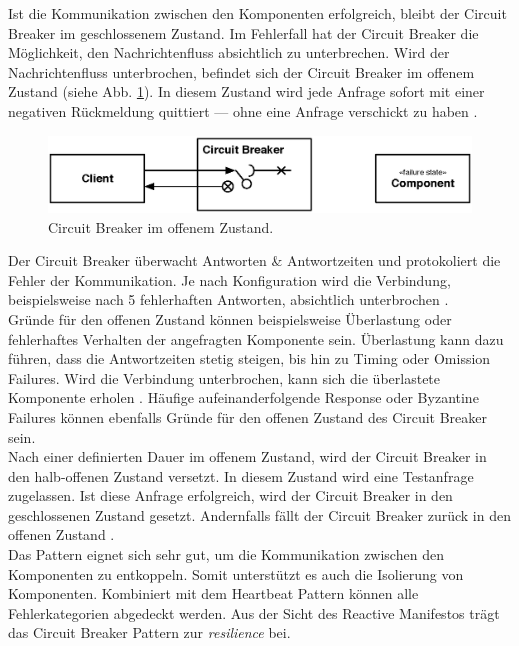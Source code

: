 Ist die Kommunikation zwischen den Komponenten erfolgreich, bleibt der Circuit Breaker im geschlossenem Zustand. Im Fehlerfall hat der Circuit Breaker die Möglichkeit, den Nachrichtenfluss absichtlich zu unterbrechen. Wird der Nachrichtenfluss unterbrochen, befindet sich der Circuit Breaker im offenem Zustand (siehe Abb. \ref{fig:circuit-breaker-open}). In diesem Zustand wird jede Anfrage sofort mit einer negativen Rückmeldung quittiert --- ohne eine Anfrage verschickt zu haben \cite[S.~94]{nygard_release_2007}.

\begin{figure}[H]
 \centering
 \includegraphics[width=1.0\textwidth]{4-Hauptteil/circuit-breaker/circuit-breaker-open.eps}
 \caption{Circuit Breaker im offenem Zustand.}
 \label{fig:circuit-breaker-open}
\end{figure}

Der Circuit Breaker überwacht Antworten \& Antwortzeiten und protokoliert die Fehler der Kommunikation. Je nach Konfiguration wird die Verbindung, beispielsweise nach 5 fehlerhaften Antworten, absichtlich unterbrochen \cite[S.~94]{nygard_release_2007}.\\
Gründe für den offenen Zustand können beispielsweise Überlastung oder fehlerhaftes Verhalten der angefragten Komponente sein. Überlastung kann dazu führen, dass die Antwortzeiten stetig steigen, bis hin zu Timing oder Omission Failures. Wird die Verbindung unterbrochen, kann sich die überlastete Komponente erholen \cite[S.~203]{kuhn_reactive_2015}. Häufige aufeinanderfolgende Response oder Byzantine Failures können ebenfalls Gründe für den offenen Zustand des Circuit Breaker sein.\\
Nach einer definierten Dauer im offenem Zustand, wird der Circuit Breaker in den halb-offenen Zustand versetzt. In diesem Zustand wird eine Testanfrage zugelassen. Ist diese Anfrage erfolgreich, wird der Circuit Breaker in den geschlossenen Zustand gesetzt. Andernfalls fällt der Circuit Breaker zurück in den offenen Zustand \cite[S.~94]{nygard_release_2007}.\\

Das Pattern eignet sich sehr gut, um die Kommunikation zwischen den Komponenten zu entkoppeln. Somit unterstützt es auch die Isolierung von Komponenten. Kombiniert mit dem Heartbeat Pattern können alle Fehlerkategorien abgedeckt werden. Aus der Sicht des Reactive Manifestos trägt das Circuit Breaker Pattern zur \textit{resilience} bei.

